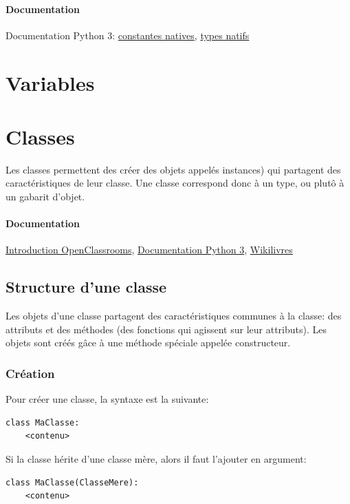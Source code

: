 \documentclass[a4paper, french, 10pt]{article}
\begin{document}
\paragraph{Documentation} Documentation Python 3: \href{https://docs.python.org/fr/3/library/constants.html}{constantes natives}, \href{https://docs.python.org/fr/3/library/stdtypes.html}{types natifs}
\section{Variables}


\section{Classes}
 Les classes permettent des créer des objets appelés instances) qui partagent des caractéristiques de leur classe. Une classe correspond donc à un type, ou plutô à un gabarit d'objet.

\paragraph{Documentation} \href{https://openclassrooms.com/courses/apprenez-a-programmer-en-python/premiere-approche-des-classes}{Introduction OpenClassrooms}, \href{https://docs.python.org/fr/3/tutorial/classes.html}{Documentation Python 3}, \href{https://fr.wikibooks.org/wiki/Programmation_Python/Classes#Définition_d'une_classe_élé mentaire}{Wikilivres}
\subsection{Structure d'une classe}
Les objets d'une classe partagent des caractéristiques communes à la classe: des attributs et des méthodes (des fonctions qui agissent sur leur attributs). Les objets sont créés g\^ace à une méthode spéciale appelée constructeur.

\subsubsection{Création}
Pour créer une classe, la syntaxe est la suivante:
\begin{verbatim}
class MaClasse:
    <contenu>
\end{verbatim}

Si la classe hérite d'une classe mère, alors il faut l'ajouter en argument:
\begin{verbatim}
class MaClasse(ClasseMere):
    <contenu>
\end{verbatim}
\end{document}
